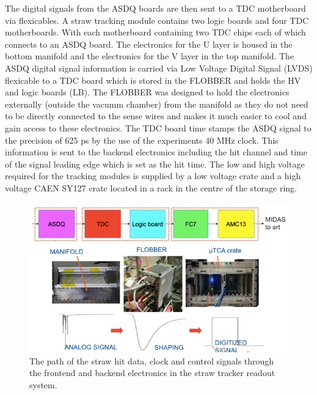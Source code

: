 The digital signals from the ASDQ boards are then sent to a TDC motherboard via flexicables. A straw tracking module contains two logic boards and four TDC motherboards. With each motherboard containing two TDC chips each of which connects to an ASDQ board. The electronics for the U layer is housed in the bottom manifold and the electronics for the V layer in the top manifold. The ASDQ digital signal information is carried via Low Voltage Digital Signal (LVDS) flexicable to a TDC board which is stored in the FLOBBER and holds the HV and logic boards (LB). The FLOBBER was designed to hold the electronics externally (outside the vacumm chamber) from the manifold as they do not need to be directly connected to the sense wires and makes it much easier to cool and gain access to these electronics. The TDC board time stamps the ASDQ signal to the precision of 625 ps by the use of the experiments 40 MHz clock. This information is sent to the backend electronics including the hit channel and time of the signal leading edge which is set as the hit time. The low and high voltage required for the tracking modules is supplied by a low voltage crate and a high voltage CAEN SY127 crate \cite{CAEN} located in a rack in the centre of the storage ring. 

\begin{figure}[th]
\centering
\includegraphics{Figures/daqdata}
\decoRule
\caption{The path of the straw hit data, clock and control signals through the frontend and backend electronics in the straw tracker readout system.}
\label{fig:daqdata}
\end{figure}


